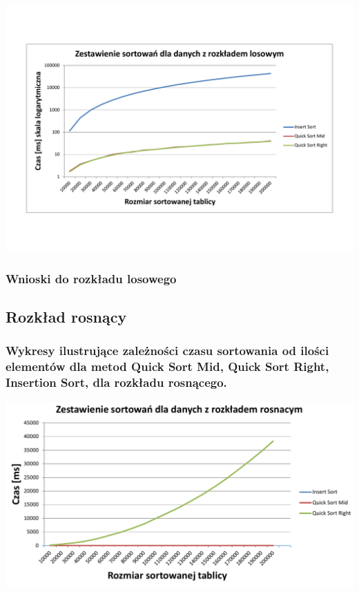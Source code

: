 \documentclass[polish,polish,a4paper]{article}
\begin{document}
\begin{spacing}{1.5}
\begin{minipage}[H]{\textwidth}
	\begin{center}
		\includegraphics[scale=0.55]{zad3losowylog.pdf}
		\label{fig:zad3loslog}
	\end{center}
\end{minipage}

\subsubsection{Wnioski do rozkładu losowego}

\subsection{Rozkład rosnący}

\subsubsection*{Wykresy ilustrujące zależności czasu sortowania od ilości elementów dla metod Quick Sort Mid, Quick Sort Right, Insertion Sort, dla rozkładu rosnącego.}
	

\begin{minipage}[H]{\textwidth}
	\begin{center}
		\includegraphics[scale=0.6]{zad3rosnacynorm.pdf}
		\label{fig:zad3rosn}
	\end{center}
\end{minipage}


\end{spacing}
\end{document}
